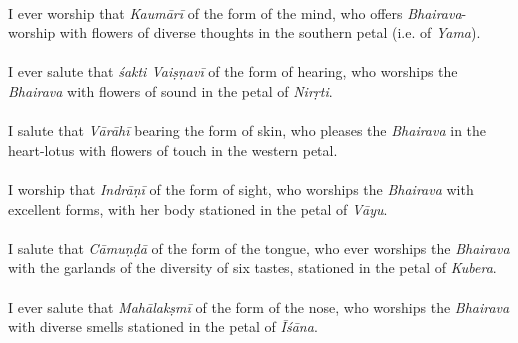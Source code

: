 \documentclass[12pt]{article}
\begin{document}
{}\\
I ever worship that \textit{Kaumārī} of the form of the mind, who offers \textit{Bhairava}-worship with flowers of diverse thoughts in the southern petal (i.e. of \textit{Yama}).\\

{}\\
I ever salute that \textit{śakti Vaiṣṇavī} of the form of hearing, who worships the \textit{Bhairava} with flowers of sound in the petal of \textit{Nirṛti}.\\

{}\\
I salute that \textit{Vārāhī} bearing the form of skin, who pleases the \textit{Bhairava} in the heart-lotus with flowers of touch in the western petal.\\

{}\\
I worship that \textit{Indrāṇī} of the form of sight, who worships the \textit{Bhairava} with excellent forms, with her body stationed in the petal of \textit{Vāyu}.\\

{}\\
I salute that \textit{Cāmuṇḍā} of the form of the tongue, who ever worships the \textit{Bhairava} with the garlands of the diversity of six tastes, stationed in the petal of \textit{Kubera}.\\

{}\\
I ever salute that \textit{Mahālakṣmī} of the form of the nose, who worships the \textit{Bhairava} with diverse smells stationed in the petal of \textit{Īśāna}.\\
\end{document}

